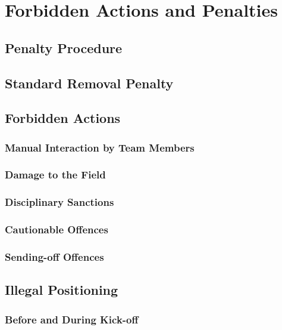 \section{Forbidden Actions and Penalties}
\label{sec:forbidden_actions}

\subsection{Penalty Procedure}
\label{sec:penalty_procedure}

\subsection{Standard Removal Penalty}
\label{sec:removal_penalty}

\subsection{Forbidden Actions}
\label{sec:forbidden_actions}

\subsubsection{Manual Interaction by Team Members}
\subsubsection{Damage to the Field}
\subsubsection{Disciplinary Sanctions}
\subsubsection{Cautionable Offences}
\subsubsection{Sending-off Offences}

\subsection{Illegal Positioning}
\label{sec:illegal_positioning}

\subsubsection{Before and During Kick-off}
